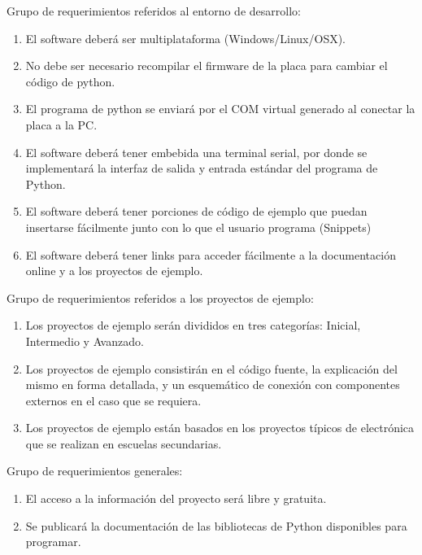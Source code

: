 Grupo de requerimientos referidos al entorno de desarrollo:
\begin{enumerate}
	\item  El software deberá ser multiplataforma (Windows/Linux/OSX).
	\item  No debe ser necesario recompilar el firmware de la placa para cambiar el código de python.
	\item  El programa de python se enviará por el COM virtual generado al conectar la placa a la PC. 
	\item  El software deberá tener embebida una terminal serial, por donde se implementará la interfaz de salida y entrada estándar del programa de Python. 
	\item  El software deberá tener porciones de código de ejemplo que puedan insertarse fácilmente junto con lo que el usuario programa (Snippets)
	\item  El software deberá tener links para acceder fácilmente a la documentación online y a los proyectos de ejemplo.
\end{enumerate}

Grupo de requerimientos referidos a los proyectos de ejemplo:
\begin{enumerate}
	\item  Los proyectos de ejemplo serán divididos en tres categorías: Inicial, Intermedio y Avanzado. 
	\item  Los proyectos de ejemplo consistirán en el código fuente, la explicación del mismo en forma detallada, y un esquemático de conexión con componentes externos en el caso que se requiera.
	\item  Los proyectos de ejemplo están basados en los proyectos típicos de electrónica que se realizan en escuelas secundarias. 
\end{enumerate}

Grupo de requerimientos generales:
\begin{enumerate}
	\item  El acceso a la información del proyecto será libre y gratuita.  
	\item  Se publicará la documentación de las bibliotecas de Python disponibles para programar.
\end{enumerate}




